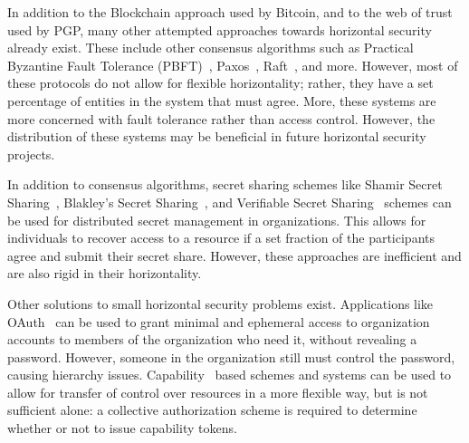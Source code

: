 
In addition to the Blockchain approach used by Bitcoin, and to the web of trust
used by PGP, many other attempted approaches towards horizontal security already
exist. These include other consensus algorithms such as Practical Byzantine
Fault Tolerance (PBFT)~\cite{castro1999practical}, Paxos~\cite{lamport2019part}, 
Raft~\cite{ongaro2013search}, and more. However, most of these protocols do not
allow for flexible horizontality; rather, they have a set percentage of
entities in the system that must agree. More, these systems are more concerned
with fault tolerance rather than access control. However, the distribution of
these systems may be beneficial in future horizontal security projects.

In addition to consensus algorithms, secret sharing schemes like Shamir Secret
Sharing~\cite{shamir1979share},
Blakley's Secret Sharing~\cite{blakley1993linear}, and Verifiable Secret 
Sharing~\cite{chor1985verifiable} schemes can be used for distributed secret
management in organizations. This allows for individuals to recover access to a
resource if a set fraction of the participants agree and submit their secret
share. However, these approaches are inefficient and are also rigid in their
horizontality.

Other solutions to small horizontal security problems exist. Applications like
OAuth~\cite{leiba2012oauth} can be used to grant minimal and ephemeral access to
organization accounts to members of the organization who need it, without
revealing a password. However, someone in the organization still must control
the password, causing hierarchy issues. Capability~\cite{dennis1966programming}
based schemes and systems can be used to allow for transfer of control over
resources in a more flexible way, but is not sufficient alone: a collective
authorization scheme is required to determine whether or not to issue capability
tokens. %

